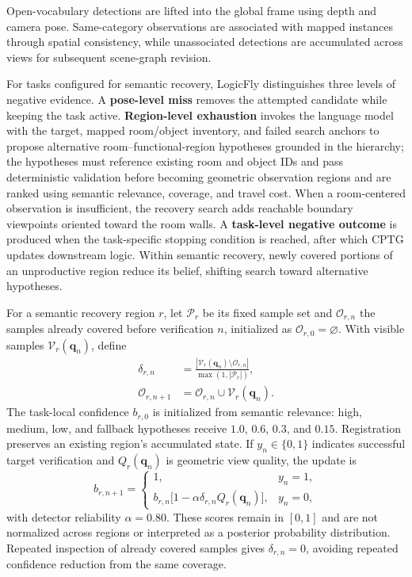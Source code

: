 \documentclass[letterpaper,10pt,journal]{IEEEtran}
\begin{document}
Open-vocabulary detections are lifted into the global frame using depth and camera pose. Same-category observations are associated with mapped instances through spatial consistency, while unassociated detections are accumulated across views for subsequent scene-graph revision.

For tasks configured for semantic recovery, LogicFly distinguishes three levels of negative evidence. A \textbf{pose-level miss} removes the attempted candidate while keeping the task active. \textbf{Region-level exhaustion} invokes the language model with the target, mapped room/object inventory, and failed search anchors to propose alternative room--functional-region hypotheses grounded in the hierarchy; the hypotheses must reference existing room and object IDs and pass deterministic validation before becoming geometric observation regions and are ranked using semantic relevance, coverage, and travel cost. When a room-centered observation is insufficient, the recovery search adds reachable boundary viewpoints oriented toward the room walls. A \textbf{task-level negative outcome} is produced when the task-specific stopping condition is reached, after which CPTG updates downstream logic. Within semantic recovery, newly covered portions of an unproductive region reduce its belief, shifting search toward alternative hypotheses.

For a semantic recovery region $r$, let $\mathcal P_r$ be its fixed sample set and $\mathcal O_{r,n}$ the samples already covered before verification $n$, initialized as $\mathcal O_{r,0}=\varnothing$. With visible samples $\mathcal V_r(\mathbf q_n)$, define
\begin{equation}
\begin{aligned}
\delta_{r,n}&=\frac{|\mathcal V_r(\mathbf q_n)\setminus\mathcal O_{r,n}|}
{\max(1,|\mathcal P_r|)},\\
\mathcal O_{r,n+1}&=\mathcal O_{r,n}\cup\mathcal V_r(\mathbf q_n).
\end{aligned}
\label{eq:recovery-coverage}
\end{equation}
The task-local confidence $b_{r,0}$ is initialized from semantic relevance: high, medium, low, and fallback hypotheses receive $1.0$, $0.6$, $0.3$, and $0.15$. Registration preserves an existing region's accumulated state. If $y_n\in\{0,1\}$ indicates successful target verification and $Q_r(\mathbf q_n)$ is geometric view quality, the update is
\begin{equation}
b_{r,n+1}=
\begin{cases}
1,&y_n=1,\\
b_{r,n}\bigl[1-\alpha\delta_{r,n}Q_r(\mathbf q_n)\bigr],&y_n=0,
\end{cases}
\label{eq:recovery-belief}
\end{equation}
with detector reliability $\alpha=0.80$. These scores remain in $[0,1]$ and are not normalized across regions or interpreted as a posterior probability distribution. Repeated inspection of already covered samples gives $\delta_{r,n}=0$, avoiding repeated confidence reduction from the same coverage.
\end{document}
